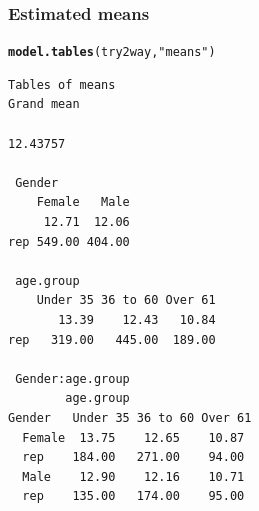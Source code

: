 \documentclass{beamer}\usepackage[]{graphicx}\usepackage[]{color}
\makeatletter
\newcommand{\hlstr}[1]{\textcolor[rgb]{0.192,0.494,0.8}{#1}}%
\newcommand{\hlstd}[1]{\textcolor[rgb]{0.345,0.345,0.345}{#1}}%
\newcommand{\hlkwd}[1]{\textcolor[rgb]{0.737,0.353,0.396}{\textbf{#1}}}%
\newenvironment{kframe}{%
 \def\at@end@of@kframe{}%
 \ifinner\ifhmode%
  \def\at@end@of@kframe{\end{minipage}}%
  \begin{minipage}{\columnwidth}%
 \fi\fi%
 \def\FrameCommand##1{\hskip\@totalleftmargin \hskip-\fboxsep
 \colorbox{shadecolor}{##1}\hskip-\fboxsep
     \hskip-\linewidth \hskip-\@totalleftmargin \hskip\columnwidth}%
 \MakeFramed {\advance\hsize-\width
   \@totalleftmargin\z@ \linewidth\hsize
   \@setminipage}}%
 {\par\unskip\endMakeFramed%
 \at@end@of@kframe}
\newenvironment{knitrout}{}{} %
\makeatother
\begin{document}
\begin{frame}[fragile]
  \frametitle{Estimated means}
\begin{knitrout}
\color{fgcolor}\begin{kframe}
\begin{alltt}
\hlkwd{model.tables}\hlstd{(try2way,} \hlstr{"means"}\hlstd{)}
\end{alltt}
\begin{verbatim}
Tables of means
Grand mean
         
12.43757 

 Gender 
    Female   Male
     12.71  12.06
rep 549.00 404.00

 age.group 
    Under 35 36 to 60 Over 61
       13.39    12.43   10.84
rep   319.00   445.00  189.00

 Gender:age.group 
        age.group
Gender   Under 35 36 to 60 Over 61
  Female  13.75    12.65    10.87 
  rep    184.00   271.00    94.00 
  Male    12.90    12.16    10.71 
  rep    135.00   174.00    95.00 
\end{verbatim}
\end{kframe}
\end{knitrout}
\end{frame} 
\end{document}
